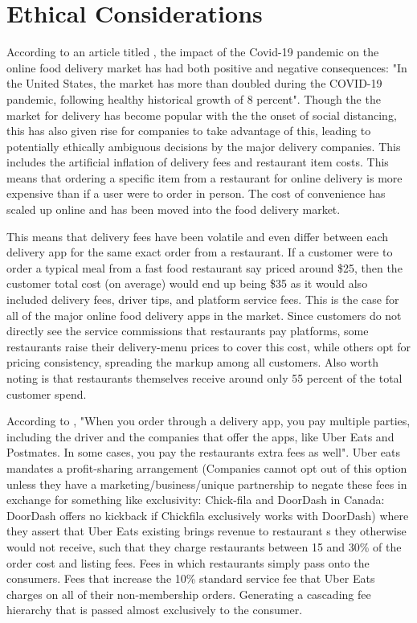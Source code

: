 \documentclass[10pt,twocolumn]{article}
\begin{document}
\section{Ethical Considerations}

According to an article titled , the impact of the Covid-19 pandemic on the online food delivery market has had both positive and negative consequences: "In the United States, the market has more than doubled during the COVID-19 pandemic, following healthy historical growth of 8 percent". Though the the market for delivery has become popular with the the onset of social distancing, this has also given rise for companies to take advantage of this, leading to potentially ethically ambiguous decisions by the major delivery companies. This includes the artificial inflation of delivery fees and restaurant item costs. This means that ordering a specific item from a restaurant for online delivery is more expensive than if a user were to order in person. The cost of convenience has scaled up online and has been moved into the food delivery market.

This means that delivery fees have been volatile and even differ between each delivery app for the same exact order from a restaurant. If a customer were to order a typical meal from a fast food restaurant say priced around \$25, then the customer total cost (on average) would end up being \$35 as it would also included delivery fees, driver tips, and platform service fees. This is the case for all of the major online food delivery apps in the market. Since customers do not directly see the service commissions that restaurants pay platforms, some restaurants raise their delivery-menu prices to cover this cost, while others opt for pricing consistency, spreading the markup among all customers. Also worth noting is that restaurants themselves receive around only 55 percent of the total customer spend.

According to , "When you order through a delivery app, you pay multiple parties, including the driver and the companies that offer the apps, like Uber Eats and Postmates. In some cases, you pay the restaurants extra fees as well".
Uber eats mandates a profit-sharing arrangement (Companies cannot opt out of this option unless they have a marketing/business/unique partnership to negate these fees in exchange for something like exclusivity: Chick-fila and DoorDash in Canada: DoorDash offers no kickback if Chickfila exclusively works with DoorDash) where they assert that Uber Eats existing brings revenue to restaurant s they otherwise would not receive, such that they charge restaurants between 15 and 30\% of the order cost and listing fees. Fees in which restaurants simply pass onto the consumers. Fees that increase the 10\% standard service fee that Uber Eats charges on all of their non-membership orders. Generating a cascading fee hierarchy that is passed almost exclusively to the consumer. 
\end{document}
